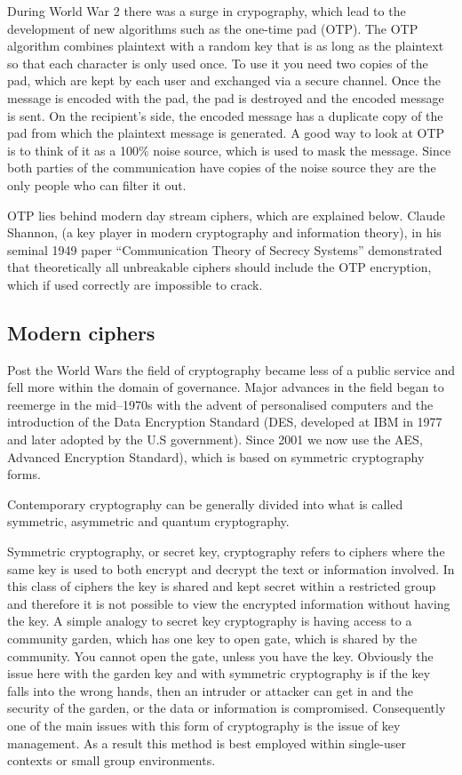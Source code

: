 During World War 2 there was a surge in crypography, which lead to the
development of new algorithms such as the one-time pad (OTP). The OTP
algorithm combines plaintext with a random key that is as long as the
plaintext so that each character is only used once. To use it you need
two copies of the pad, which are kept by each user and exchanged via a
secure channel. Once the message is encoded with the pad, the pad is
destroyed and the encoded message is sent. On the recipient's side, the
encoded message has a duplicate copy of the pad from which the plaintext
message is generated. A good way to look at OTP is to think of it as a
100\% noise source, which is used to mask the message. Since both
parties of the communication have copies of the noise source they are
the only people who can filter it out.

OTP lies behind modern day stream ciphers, which are explained below.
Claude Shannon, (a key player in modern cryptography and information
theory), in his seminal 1949 paper ``Communication Theory of Secrecy
Systems'' demonstrated that theoretically all unbreakable ciphers should
include the OTP encryption, which if used correctly are impossible to
crack.

\subsection{Modern ciphers}

Post the World Wars the field of cryptography became less of a public
service and fell more within the domain of governance. Major advances in
the field began to reemerge in the mid--1970s with the advent of
personalised computers and the introduction of the Data Encryption
Standard (DES, developed at IBM in 1977 and later adopted by the U.S
government). Since 2001 we now use the AES, Advanced Encryption
Standard), which is based on symmetric cryptography forms.

Contemporary cryptography can be generally divided into what is called
symmetric, asymmetric and quantum cryptography.

Symmetric cryptography, or secret key, cryptography refers to ciphers
where the same key is used to both encrypt and decrypt the text or
information involved. In this class of ciphers the key is shared and
kept secret within a restricted group and therefore it is not possible
to view the encrypted information without having the key. A simple
analogy to secret key cryptography is having access to a community
garden, which has one key to open gate, which is shared by the
community. You cannot open the gate, unless you have the key. Obviously
the issue here with the garden key and with symmetric cryptography is if
the key falls into the wrong hands, then an intruder or attacker can get
in and the security of the garden, or the data or information is
compromised. Consequently one of the main issues with this form of
cryptography is the issue of key management. As a result this method is
best employed within single-user contexts or small group environments.

